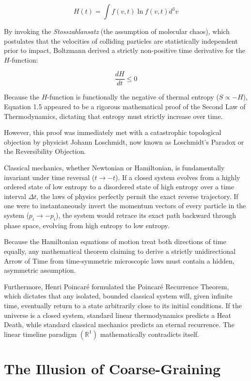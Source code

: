 \documentclass[12pt,openany]{book}
\theoremstyle{plain}
\theoremstyle{definition}
\theoremstyle{remark}
\begin{document}
\begin{equation}
H(t) = \int f(v, t) \ln f(v, t) d^3v
\end{equation}

By invoking the \textit{Stosszahlansatz} (the assumption of molecular chaos), which postulates that the velocities of colliding particles are statistically independent prior to impact, Boltzmann derived a strictly non-positive time derivative for the $H$-function:

\begin{equation}
\frac{dH}{dt} \le 0
\end{equation}

Because the $H$-function is functionally the negative of thermal entropy ($S \propto -H$), Equation 1.5 appeared to be a rigorous mathematical proof of the Second Law of Thermodynamics, dictating that entropy must strictly increase over time. 

However, this proof was immediately met with a catastrophic topological objection by physicist Johann Loschmidt, now known as Loschmidt's Paradox or the Reversibility Objection. 

Classical mechanics, whether Newtonian or Hamiltonian, is fundamentally invariant under time reversal ($t \to -t$). If a closed system evolves from a highly ordered state of low entropy to a disordered state of high entropy over a time interval $\Delta t$, the laws of physics perfectly permit the exact reverse trajectory. If one were to instantaneously invert the momentum vectors of every particle in the system ($p_i \to -p_i$), the system would retrace its exact path backward through phase space, evolving from high entropy to low entropy. 

Because the Hamiltonian equations of motion treat both directions of time equally, any mathematical theorem claiming to derive a strictly unidirectional Arrow of Time from time-symmetric microscopic laws must contain a hidden, asymmetric assumption. 

Furthermore, Henri Poincaré formulated the Poincaré Recurrence Theorem, which dictates that any isolated, bounded classical system will, given infinite time, eventually return to a state arbitrarily close to its initial conditions. If the universe is a closed system, standard linear thermodynamics predicts a Heat Death, while standard classical mechanics predicts an eternal recurrence. The linear timeline paradigm $(\mathbb{R}^1)$ mathematically contradicts itself.

\section{The Illusion of Coarse-Graining}
\end{document}
